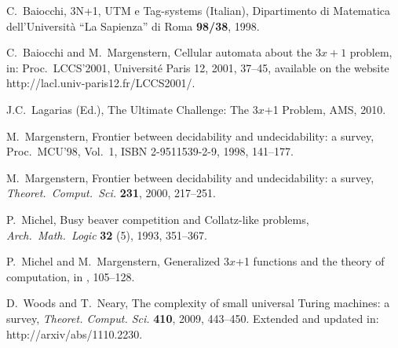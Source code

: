 \documentclass[10pt]{article}
\begin{document}
\begin{thebibliography}{99}
 C.\ Baiocchi, 3N+1, UTM e Tag-systems (Italian),
Dipartimento di Matematica dell'Universit\`a ``La Sapienza'' di Roma {\bf 98/38}, 1998.

 C.\ Baiocchi and M.\ Margenstern, Cellular automata about
the $3x + 1$ problem, in: Proc.\ LCCS'2001, Universit\'e Paris 12, 2001, 37--45,
available on the website http://lacl.univ-paris12.fr/LCCS2001/.

 J.C.\ Lagarias (Ed.), The Ultimate Challenge: The 3$x$+1 Problem, AMS, 2010.

 M.\ Margenstern, Frontier between decidability and undecidability: a survey,
Proc.\ MCU'98, Vol.\ 1, ISBN 2-9511539-2-9, 1998, 141--177.

 M.\ Margenstern, Frontier between decidability and undecidability:
a survey, \emph{Theoret.\ Comput.\ Sci.} {\bf 231}, 2000, 217--251.

 P.\ Michel, Busy beaver competition and Collatz-like problems,
\emph{Arch.\ Math.\ Logic} {\bf 32} (5), 1993, 351--367.

 P.\ Michel and M.\ Margenstern, Generalized 3$x$+1 functions and the theory of computation,
in \cite{La10}, 105--128.

 D.\ Woods and T.\ Neary, The complexity of small universal Turing machines:
a survey, \emph{Theoret. Comput. Sci.} {\bf 410}, 2009, 443--450.
Extended and updated in: http://arxiv/abs/1110.2230.


\end{thebibliography}
\end{document}
